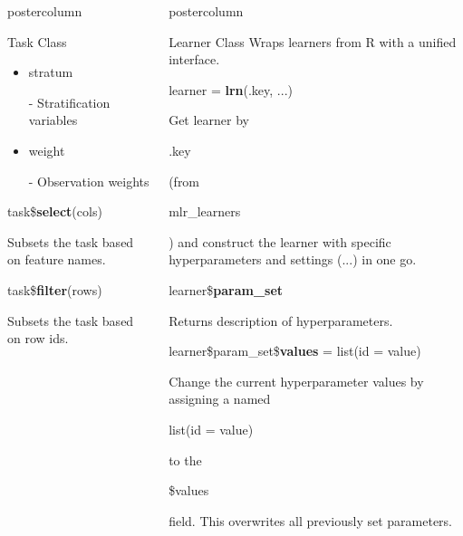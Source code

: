 \documentclass{beamer}
\newlength{\columnheight} %
\newcommand{\codeinline}[1]{\begin{codeboxinline}#1\end{codeboxinline}}
\begin{document}
\begin{frame}[fragile]{}
\begin{columns}
\begin{column}{.245\textwidth}
\begin{beamercolorbox}[center]{postercolumn}
\begin{minipage}{.98\textwidth}
{\begin{myblock}{Task Class}
\begin{itemize}
							\item \codeinline{stratum} - Stratification variables
							\item \codeinline{weight} - Observation weights
						\end{itemize}
						\vspace{1em}
						\begin{codebox}
							task\$\textbf{select}(cols)
						\end{codebox}
						Subsets the task based on feature names.
						\\
						\begin{codebox}
							task\$\textbf{filter}(rows)
						\end{codebox}
						Subsets the task based on row ids.
					\end{myblock}
					\vfill
					}
				\end{minipage}
			\end{beamercolorbox}
		\end{column}
		\begin{column}{.245\textwidth}
			\begin{beamercolorbox}[center]{postercolumn}
				\begin{minipage}{.98\textwidth}
					\parbox[t][\columnheight]{\textwidth}{
						\begin{myblock}{Learner Class}
						Wraps learners from R with a unified interface.
						\\
						\begin{codebox}
							learner = \textbf{lrn}(.key, ...)
						\end{codebox}
						Get learner by \codeinline{.key} (from \codeinline{mlr\_learners}) and construct the learner with specific hyperparameters and settings (...) in one go.
						\\
						\vspace{1em}
						\begin{codebox}
							learner\$\textbf{param\_set}
						\end{codebox}
						Returns description of hyperparameters.	
						\\
						\begin{codebox}
							learner\$param\_set\$\textbf{values} = list(id = value)
						\end{codebox}
						Change the current hyperparameter values by assigning a named \codeinline{list(id = value)} to the \codeinline{\$values} field.
						This overwrites all previously set parameters.	
						\\
						\begin{codeboxmultiline}[width=18cm]

\end{codeboxmultiline}
\end{myblock}}
\end{minipage}
\end{beamercolorbox}
\end{column}
\end{columns}
\end{frame}
\end{document}
